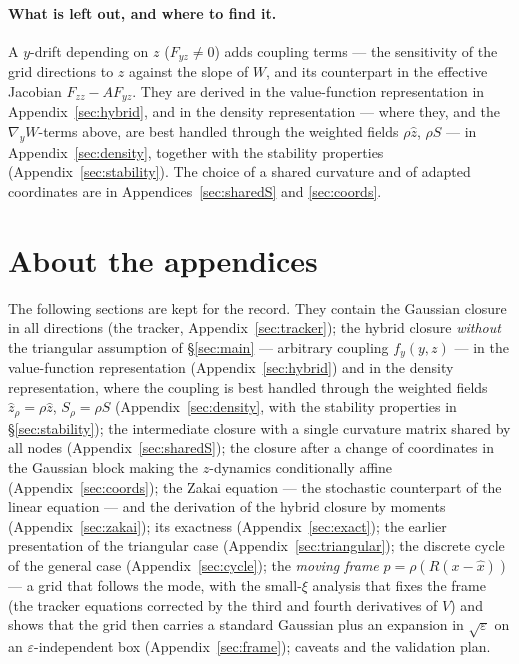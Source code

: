 \documentclass[11pt,a4paper]{article}
\newcommand{\xh}{\hat{x}}
\newcommand{\zh}{\hat{z}}
\newcommand{\zr}{\hat{z}_{\rho}}   %
\newcommand{\Sr}{S_{\rho}}          %
\newcommand{\eps}{\varepsilon}
\newcommand{\gy}{\nabla_{\!y}}
\theoremstyle{plain}
\theoremstyle{definition}
\theoremstyle{remark}
\begin{document}
\paragraph{What is left out, and where to find it.}
A $y$-drift depending on $z$ ($F_{yz}\ne0$) adds coupling terms --- the sensitivity of the grid directions to $z$ against the slope of $W$, and its counterpart in the effective Jacobian $F_{zz}-AF_{yz}$. They are derived in the value-function representation in Appendix~\ref{sec:hybrid}, and in the density representation --- where they, and the $\gy W$-terms above, are best handled through the weighted fields $\rho\zh$, $\rho S$ --- in Appendix~\ref{sec:density}, together with the stability properties (Appendix~\ref{sec:stability}). The choice of a shared curvature and of adapted coordinates are in Appendices~\ref{sec:sharedS} and \ref{sec:coords}.

\appendix
\section*{About the appendices}
The following sections are kept for the record. They contain the Gaussian closure in all directions (the tracker, Appendix~\ref{sec:tracker}); the hybrid closure \emph{without} the triangular assumption of \S\ref{sec:main} --- arbitrary coupling $f_y(y,z)$ --- in the value-function representation (Appendix~\ref{sec:hybrid}) and in the density representation, where the coupling is best handled through the weighted fields $\zr=\rho\zh$, $\Sr=\rho S$ (Appendix~\ref{sec:density}, with the stability properties in \S\ref{sec:stability}); the intermediate closure with a single curvature matrix shared by all nodes (Appendix~\ref{sec:sharedS}); the closure after a change of coordinates in the Gaussian block making the $z$-dynamics conditionally affine (Appendix~\ref{sec:coords}); the Zakai equation --- the stochastic counterpart of the linear equation --- and the derivation of the hybrid closure by moments (Appendix~\ref{sec:zakai}); its exactness (Appendix~\ref{sec:exact}); the earlier presentation of the triangular case (Appendix~\ref{sec:triangular}); the discrete cycle of the general case (Appendix~\ref{sec:cycle}); the \emph{moving frame} $p=\rho(R(x-\xh))$ --- a grid that follows the mode, with the small-$\xi$ analysis that fixes the frame (the tracker equations corrected by the third and fourth derivatives of $V$) and shows that the grid then carries a standard Gaussian plus an expansion in $\sqrt\eps$ on an $\eps$-independent box (Appendix~\ref{sec:frame}); caveats and the validation plan.
\end{document}
